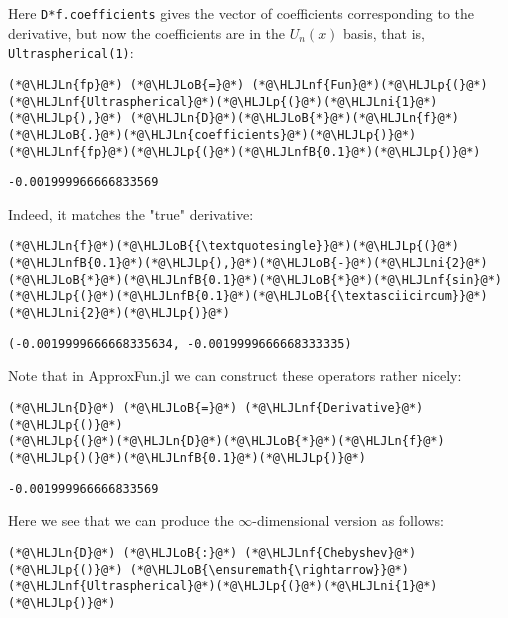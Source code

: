 \documentclass[12pt,landscape]{article}
\newcommand{\HLJLn}[1]{#1}
\newcommand{\HLJLnf}[1]{\textcolor[RGB]{66,102,213}{#1}}
\newcommand{\HLJLnfB}[1]{\textcolor[RGB]{59,151,46}{#1}}
\newcommand{\HLJLni}[1]{\textcolor[RGB]{59,151,46}{#1}}
\newcommand{\HLJLoB}[1]{\textcolor[RGB]{102,102,102}{\textbf{#1}}}
\newcommand{\HLJLp}[1]{#1}
\begin{document}
{Here \texttt{D*f.coefficients} gives the vector of coefficients corresponding to the derivative, but now the coefficients are in the $U_n(x)$ basis, that is, \texttt{Ultraspherical(1)}:


\begin{lstlisting}
(*@\HLJLn{fp}@*) (*@\HLJLoB{=}@*) (*@\HLJLnf{Fun}@*)(*@\HLJLp{(}@*)(*@\HLJLnf{Ultraspherical}@*)(*@\HLJLp{(}@*)(*@\HLJLni{1}@*)(*@\HLJLp{),}@*) (*@\HLJLn{D}@*)(*@\HLJLoB{*}@*)(*@\HLJLn{f}@*)(*@\HLJLoB{.}@*)(*@\HLJLn{coefficients}@*)(*@\HLJLp{)}@*)
(*@\HLJLnf{fp}@*)(*@\HLJLp{(}@*)(*@\HLJLnfB{0.1}@*)(*@\HLJLp{)}@*)
\end{lstlisting}

\begin{lstlisting}
-0.001999966666833569
\end{lstlisting}


Indeed, it matches the "true" derivative:


\begin{lstlisting}
(*@\HLJLn{f}@*)(*@\HLJLoB{{\textquotesingle}}@*)(*@\HLJLp{(}@*)(*@\HLJLnfB{0.1}@*)(*@\HLJLp{),}@*)(*@\HLJLoB{-}@*)(*@\HLJLni{2}@*)(*@\HLJLoB{*}@*)(*@\HLJLnfB{0.1}@*)(*@\HLJLoB{*}@*)(*@\HLJLnf{sin}@*)(*@\HLJLp{(}@*)(*@\HLJLnfB{0.1}@*)(*@\HLJLoB{{\textasciicircum}}@*)(*@\HLJLni{2}@*)(*@\HLJLp{)}@*)
\end{lstlisting}

\begin{lstlisting}
(-0.0019999666668335634, -0.0019999666668333335)
\end{lstlisting}


Note that in ApproxFun.jl we can construct these operators rather nicely:


\begin{lstlisting}
(*@\HLJLn{D}@*) (*@\HLJLoB{=}@*) (*@\HLJLnf{Derivative}@*)(*@\HLJLp{()}@*)
(*@\HLJLp{(}@*)(*@\HLJLn{D}@*)(*@\HLJLoB{*}@*)(*@\HLJLn{f}@*)(*@\HLJLp{)(}@*)(*@\HLJLnfB{0.1}@*)(*@\HLJLp{)}@*)
\end{lstlisting}

\begin{lstlisting}
-0.001999966666833569
\end{lstlisting}

\newpage
Here we see that we can produce the \ensuremath{\infty}-dimensional version as follows:


\begin{lstlisting}
(*@\HLJLn{D}@*) (*@\HLJLoB{:}@*) (*@\HLJLnf{Chebyshev}@*)(*@\HLJLp{()}@*) (*@\HLJLoB{\ensuremath{\rightarrow}}@*) (*@\HLJLnf{Ultraspherical}@*)(*@\HLJLp{(}@*)(*@\HLJLni{1}@*)(*@\HLJLp{)}@*)
\end{lstlisting}

}
\end{document}
